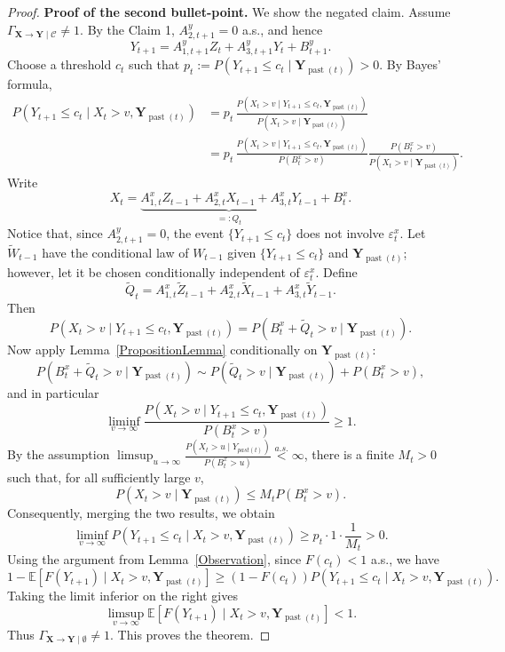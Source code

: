 \documentclass[a4paper,11pt]{article}
\DeclareMathOperator{\past}{past}
\begin{document}
\begin{proof}
\textbf{Proof of the second bullet-point. }
We show the negated claim. Assume \(\Gamma_{\mathbf X\to\mathbf Y\mid\mathcal C}\neq1\). By the Claim 1, \(A^y_{2,t+1}=0\) a.s., and hence
\[
Y_{t+1}
=
A^y_{1,t+1}Z_t
+
A^y_{3,t+1}Y_t
+
B^y_{t+1}.
\]
Choose a threshold \(c_t\) such that \(
p_t:=P(Y_{t+1}\le c_t\mid\mathbf Y_{\past(t)})>0. 
\) By Bayes' formula,
\begin{equation*}
    \begin{split}
        P(Y_{t+1}\le c_t\mid X_t>v,\mathbf Y_{\past(t)})
&=
p_t\,
\frac{
P(X_t>v\mid Y_{t+1}\le c_t,\mathbf Y_{\past(t)})
}{
P(X_t>v\mid\mathbf Y_{\past(t)})
} \\& = p_t\,
\frac{
P(X_t>v\mid Y_{t+1}\le c_t,\mathbf Y_{\past(t)})
}{P(B^x_t>v)} \frac{P(B^x_t>v)}{
P(X_t>v\mid\mathbf Y_{\past(t)})
}.
    \end{split}
\end{equation*}
Write
\[
X_t
=
\underbrace{
A^x_{1,t}Z_{t-1}
+
A^x_{2,t}X_{t-1}
+
A^x_{3,t}Y_{t-1}
}_{=:Q_t}
+
B^x_t .
\]
Notice that, since \(A^y_{2,t+1}=0\), the event
\(\{Y_{t+1}\le c_t\}\) does not involve \(\varepsilon^x_t\). Let
\(\widetilde W_{t-1}\) have the conditional law of \(W_{t-1}\) given
\(\{Y_{t+1}\le c_t\}\) and \(\mathbf Y_{\past(t)}\); however, let it be chosen conditionally independent of
\(\varepsilon^x_t\). Define
\[
\widetilde Q_t
=
A^x_{1,t}\widetilde Z_{t-1}
+
A^x_{2,t}\widetilde X_{t-1}
+
A^x_{3,t}\widetilde Y_{t-1}.
\]
Then
\[
P(X_t>v\mid Y_{t+1}\le c_t,\mathbf Y_{\past(t)})
=
P(B^x_t+\widetilde Q_t>v\mid\mathbf Y_{\past(t)}).
\]
Now apply Lemma~\ref{PropositionLemma} conditionally on \(\mathbf Y_{\past(t)}\):
\[
P(B^x_t+\widetilde Q_t>v\mid\mathbf Y_{\past(t)})
\sim
P(\widetilde Q_t>v\mid\mathbf Y_{\past(t)})
+
P(B^x_t>v),
\]
and in particular
\[
\liminf_{v\to\infty}
\frac{
P(X_t>v\mid Y_{t+1}\le c_t,\mathbf Y_{\past(t)})
}{
P(B^x_t>v)
}
\ge 1 .
\]
By the assumption $\operatorname{lim sup}_{u\to\infty}\frac{P(X_t>u\mid Y_{past(t)})}{P(B_t^x>u)}\overset{a.s.}{<}\infty$, there is a finite \(M_t>0\) such that, for all sufficiently large \(v\),
\[
P(X_t>v\mid\mathbf Y_{\past(t)})
\le
M_t P(B^x_t>v).
\]
Consequently, merging the two results, we obtain
\[
\liminf_{v\to\infty}
P(Y_{t+1}\le c_t\mid X_t>v,\mathbf Y_{\past(t)})
\ge
p_t \cdot 1 \cdot \frac{1}{M_t}
>0 .
\]
Using the argument from Lemma~\ref{Observation}, since \(F(c_t)<1\) a.s., we have
\[
1-
\mathbb E[F(Y_{t+1})\mid X_t>v,\mathbf Y_{\past(t)}]
\ge
(1-F(c_t))
P(Y_{t+1}\le c_t\mid X_t>v,\mathbf Y_{\past(t)}).
\]
Taking the limit inferior on the right gives
\[
\limsup_{v\to\infty}
\mathbb E[F(Y_{t+1})\mid X_t>v,\mathbf Y_{\past(t)}]
<1 .
\]
Thus \(\Gamma_{\mathbf X\to\mathbf Y\mid\emptyset}\neq1\). This proves the theorem. 
\end{proof}
\end{document}
